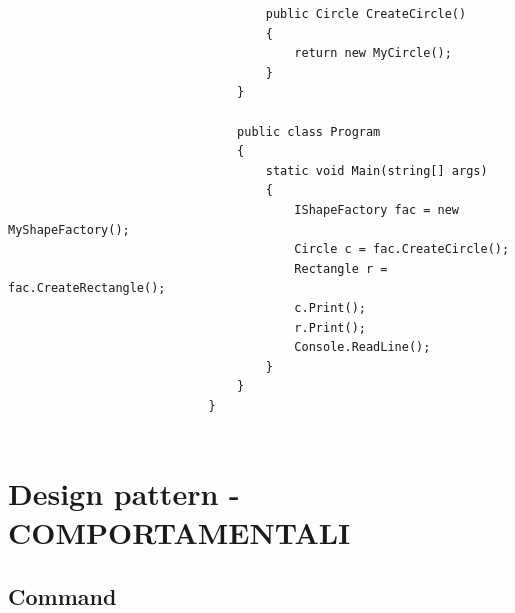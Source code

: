 \documentclass[a4paper,10pt]{article}
\begin{document}
\begin{lstlisting}
                                    public Circle CreateCircle()
                                    {
                                        return new MyCircle();
                                    }
                                }
                            
                                public class Program
                                {
                                    static void Main(string[] args)
                                    {
                                        IShapeFactory fac = new MyShapeFactory();
                                        Circle c = fac.CreateCircle();
                                        Rectangle r = fac.CreateRectangle();
                                        c.Print();
                                        r.Print();
                                        Console.ReadLine();
                                    }
                                }
                            }
                            
                        \end{lstlisting}
                        \newpage
                        \section{Design pattern - COMPORTAMENTALI}
                        \subsection{Command}
\end{document}
